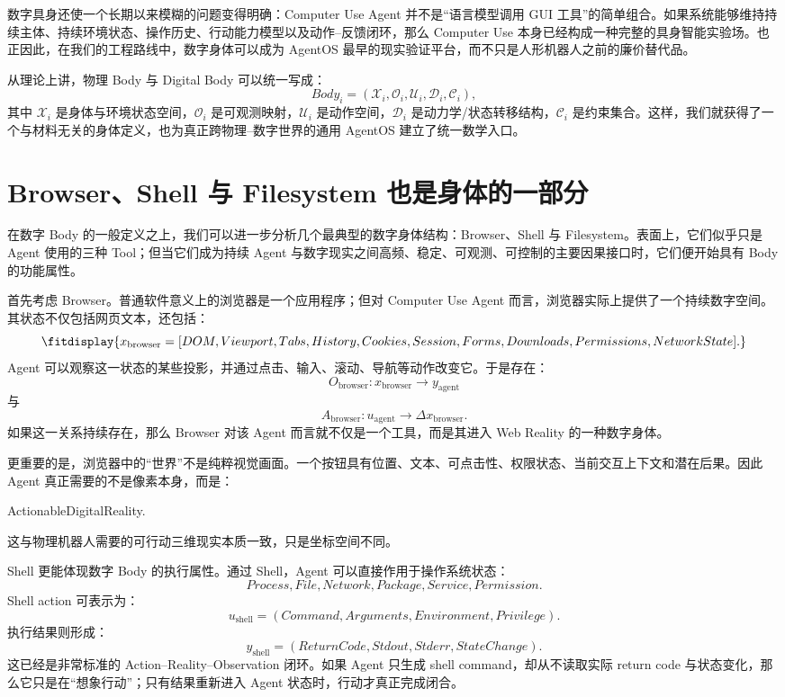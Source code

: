 数字具身还使一个长期以来模糊的问题变得明确：Computer Use Agent 并不是“语言模型调用 GUI 工具”的简单组合。如果系统能够维持持续主体、持续环境状态、操作历史、行动能力模型以及动作--反馈闭环，那么 Computer Use 本身已经构成一种完整的具身智能实验场。也正因此，在我们的工程路线中，数字身体可以成为 AgentOS 最早的现实验证平台，而不只是人形机器人之前的廉价替代品。

从理论上讲，物理 Body 与 Digital Body 可以统一写成：
\[
\boxed{
Body_i
=
(
\mathcal X_i,
\mathcal O_i,
\mathcal U_i,
\mathcal D_i,
\mathcal C_i
),
}
\]
其中 $\mathcal X_i$ 是身体与环境状态空间，$\mathcal O_i$ 是可观测映射，$\mathcal U_i$ 是动作空间，$\mathcal D_i$ 是动力学/状态转移结构，$\mathcal C_i$ 是约束集合。这样，我们就获得了一个与材料无关的身体定义，也为真正跨物理--数字世界的通用 AgentOS 建立了统一数学入口。

\section{Browser、Shell 与 Filesystem 也是身体的一部分}

在数字 Body 的一般定义之上，我们可以进一步分析几个最典型的数字身体结构：Browser、Shell 与 Filesystem。表面上，它们似乎只是 Agent 使用的三种 Tool；但当它们成为持续 Agent 与数字现实之间高频、稳定、可观测、可控制的主要因果接口时，它们便开始具有 Body 的功能属性。

首先考虑 Browser。普通软件意义上的浏览器是一个应用程序；但对 Computer Use Agent 而言，浏览器实际上提供了一个持续数字空间。其状态不仅包括网页文本，还包括：
\[
\fitdisplay{
x_{\mathrm{browser}}
=
[
DOM,
Viewport,
Tabs,
History,
Cookies,
Session,
Forms,
Downloads,
Permissions,
NetworkState
].
}
\]
Agent 可以观察这一状态的某些投影，并通过点击、输入、滚动、导航等动作改变它。于是存在：
\[
O_{\mathrm{browser}}
:
x_{\mathrm{browser}}
\rightarrow
y_{\mathrm{agent}}
\]
与
\[
A_{\mathrm{browser}}
:
u_{\mathrm{agent}}
\rightarrow
\Delta x_{\mathrm{browser}}.
\]
如果这一关系持续存在，那么 Browser 对该 Agent 而言就不仅是一个工具，而是其进入 Web Reality 的一种数字身体。

更重要的是，浏览器中的“世界”不是纯粹视觉画面。一个按钮具有位置、文本、可点击性、权限状态、当前交互上下文和潜在后果。因此 Agent 真正需要的不是像素本身，而是：
\begin{statementbox}
ActionableDigitalReality.
\end{statementbox}
这与物理机器人需要的可行动三维现实本质一致，只是坐标空间不同。

Shell 更能体现数字 Body 的执行属性。通过 Shell，Agent 可以直接作用于操作系统状态：
\[
Process,
File,
Network,
Package,
Service,
Permission.
\]
Shell action 可表示为：
\[
u_{\mathrm{shell}}
=
(Command,Arguments,Environment,Privilege).
\]
执行结果则形成：
\[
y_{\mathrm{shell}}
=
(ReturnCode,Stdout,Stderr,StateChange).
\]
这已经是非常标准的 Action--Reality--Observation 闭环。如果 Agent 只生成 shell command，却从不读取实际 return code 与状态变化，那么它只是在“想象行动”；只有结果重新进入 Agent 状态时，行动才真正完成闭合。


